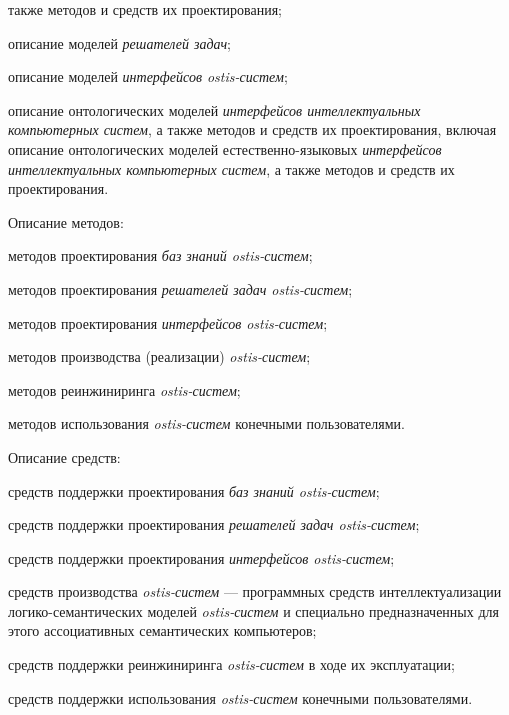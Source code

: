 \begin{SCn}
{\begin{scnitemize}
\begin{scnitemizeii}
\begin{scnitemizeiii}
					также методов и средств их проектирования;
					\item описание моделей \textit{решателей задач};
					\item описание моделей \textit{интерфейсов ostis-систем};
					\item описание онтологических моделей \textit{интерфейсов
						интеллектуальных компьютерных систем}, а также методов и средств их
					проектирования, включая описание онтологических моделей естественно-языковых
					\textit{интерфейсов интеллектуальных компьютерных систем}, а также методов и
					средств их проектирования.
				\end{scnitemizeiii}
				\item Описание методов:
				\begin{scnitemizeiii}
					\item методов проектирования \textit{баз знаний ostis-систем};
					\item методов проектирования \textit{решателей задач ostis-систем};
					\item методов проектирования \textit{интерфейсов ostis-систем};
					\item методов производства (реализации) \textit{ostis-систем};
					\item методов реинжиниринга \textit{ostis-систем};
					\item методов использования \textit{ostis-систем} конечными
					пользователями.
				\end{scnitemizeiii}
				\item Описание средств:
				\begin{scnitemizeiii}
					\item средств поддержки проектирования \textit{баз знаний
						ostis-систем};
					\item средств поддержки проектирования \textit{решателей задач
						ostis-систем};
					\item средств поддержки проектирования \textit{интерфейсов
						ostis-систем};
					\item средств производства \textit{ostis-систем} --- программных средств
					интеллектуализации логико-семантических моделей \textit{ostis-систем} и
					специально предназначенных для этого ассоциативных семантических компьютеров;
					\item средств поддержки реинжиниринга \textit{ostis-систем} в ходе их
					эксплуатации;
					\item средств поддержки использования \textit{ostis-систем} конечными
					пользователями.

\end{scnitemizeiii}
\end{scnitemizeii}
\end{scnitemize}}
\end{SCn}
